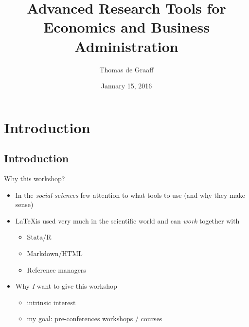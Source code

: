 \documentclass[ignorenonframetext,]{beamer}
\title{Advanced Research Tools for Economics and Business Administration}
\author{Thomas de Graaff}
\date{January 15, 2016}
\begin{document}
	\frame{\titlepage}

\section{Introduction}\label{introduction}

\subsection{Introduction}\label{introduction-1}

\begin{frame}{Why this workshop?}

\begin{itemize}
\item
  In the \emph{social sciences} few attention to what tools to use (and
  why they make sense)
\item
  \LaTeX is used very much in the scientific world and can \emph{work}
  together with

  \begin{itemize}
  \itemsep1pt\parskip0pt
  \item
    Stata/R
  \item
    Markdown/HTML
  \item
    Reference managers
  \end{itemize}
\item
  Why \emph{I} want to give this workshop

  \begin{itemize}
  \itemsep1pt\parskip0pt
  \item
    intrinsic interest
  \item
    my goal: pre-conferences workshops / courses
  \end{itemize}
\end{itemize}

\end{frame}
\end{document}
